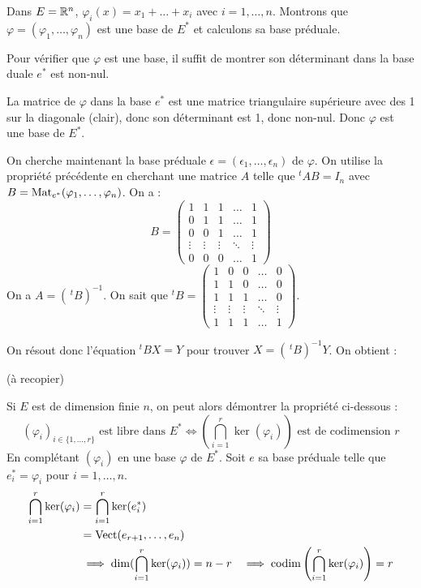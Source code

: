 \documentclass[11pt,a4paper]{report}
\begin{document}
\begin{example}
    Dans $E = \mathbb{R}^n$, $\varphi_i(x) = x_1 + \dots + x_i$ avec $i = 1, \dots, n$. Montrons que $\varphi = (\varphi_1, \dots, \varphi_n)$ est une base de $E^*$ et calculons sa base préduale.

    Pour vérifier que $\varphi$ est une base, il suffit de montrer son déterminant dans la base duale $e^*$ est non-nul.

    La matrice de $\varphi$ dans la base $e^*$ est une matrice triangulaire supérieure avec des 1 sur la diagonale (clair), donc son déterminant est 1, donc non-nul. Donc $\varphi$ est une base de $E^*$.

    On cherche maintenant la base préduale $\epsilon = (\epsilon_1, \dots, \epsilon_n)$ de $\varphi$. On utilise la propriété précédente en cherchant une matrice $A$ telle que $^tAB = I_n$ avec $B = \mathrm{Mat}_{e^*}(\varphi_1, \dots, \varphi_n)$. On a :
    $$B = \begin{pmatrix}
        1 & 1 & 1 & \dots & 1 \\
        0 & 1 & 1 & \dots & 1 \\
        0 & 0 & 1 & \dots & 1 \\
        \vdots & \vdots & \vdots & \ddots & \vdots \\
        0 & 0 & 0 & \dots & 1
    \end{pmatrix}$$
    On a $A = (\,^tB)^{-1}$.
    On sait que $^tB = \begin{pmatrix}
        1 & 0 & 0 & \dots & 0 \\
        1 & 1 & 0 & \dots & 0 \\
        1 & 1 & 1 & \dots & 0 \\
        \vdots & \vdots & \vdots & \ddots & \vdots \\
        1 & 1 & 1 & \dots & 1
    \end{pmatrix}$.

    On résout donc l'équation $^tBX = Y$ pour trouver $X = (\,^tB)^{-1}Y$. On obtient :

    (à recopier)
\end{example}
\todo

\begin{remark}
    Si $E$ est de dimension finie $n$, on peut alors démontrer la propriété ci-dessous :
    $$(\varphi_i)_{i \in \{1,\dots,r\}} \text{ est libre dans } E^* \iff (\bigcap_{i=1}^r \ker(\varphi_i)) \text{ est de codimension } r$$
    En complétant $(\varphi_i)$ en une base $\varphi$ de $E^*$. Soit $e$ sa base préduale telle que $e_i^* = \varphi_i$ pour $i=1,\dots,n$.
    \begin{align*}
        \bigcap_{i=1}^r \ker(\varphi_i) &= \bigcap_{i=1}^r \ker(e_i^*) \\
        &= \mathrm{Vect}(e_{r+1},\dots,e_n) \\
        &\implies \dim(\bigcap_{i=1}^r \ker(\varphi_i)) = n - r
        &\implies \mathrm{codim}\left(\bigcap_{i=1}^r \ker(\varphi_i)\right) = r
    \end{align*}
\end{remark}
\end{document}
